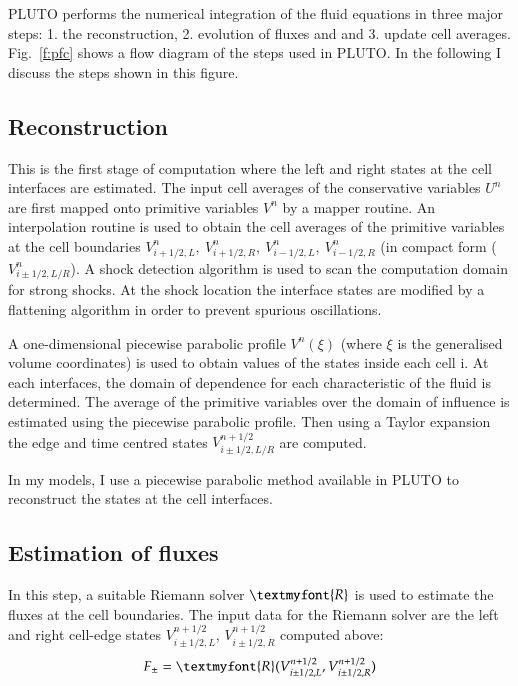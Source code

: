 PLUTO performs the numerical integration of the fluid equations in three major steps: 1. the reconstruction, 2. evolution of fluxes and and 3. update cell averages. Fig.~\ref{f:pfc} shows a flow diagram of the steps used in PLUTO. In the following I discuss the steps shown in this figure. 
 
 
\subsection{Reconstruction}
This is the first stage of computation where the left and right states at the cell interfaces are estimated. The input cell averages of the conservative variables $U^n$ are first mapped onto primitive variables $V^n$ by a mapper routine. An interpolation routine is used to obtain the cell averages of the primitive variables at the cell boundaries $V^n_{i+1/2, L}, \ V^n_{i+1/2, R}, \ V^n_{i-1/2, L}, \ V^n_{i-1/2, R}$ (in compact form ($V^n_{i\pm1/2, L/R}$). A shock detection algorithm is used to scan the computation domain for strong shocks. At the shock location the interface states are modified by a flattening algorithm in order to prevent spurious oscillations. 

A one-dimensional piecewise parabolic profile $V^n\left ({\xi} \right )$ (where $\xi$ is the generalised volume coordinates) is used to obtain values of the states inside each cell i. At each interfaces, the domain of dependence for each characteristic of the fluid is determined. The average of the primitive variables over the domain of influence is estimated using the piecewise parabolic profile. Then using a Taylor expansion the edge and time centred states $V^{n+1/2}_{i\pm1/2, L/R}$ are computed. 

In my models, I use a piecewise parabolic method available in PLUTO \citep{mignone05} to reconstruct the states at the cell interfaces. 

\subsection{Estimation of fluxes}
 In this step, a suitable Riemann solver $\textmyfont{R}$ is used to estimate the fluxes at the cell boundaries. The input data for the Riemann solver are the left and right cell-edge states $V^{n+1/2}_{i\pm1/2, L}$, $V^{n+1/2}_{i\pm1/2, R}$ computed above:
\begin{equation}
F_{\pm} = \textmyfont{R}(V^{n+1/2}_{i\pm1/2, L}, V^{n+1/2}_{i\pm1/2, R})
\end{equation}


